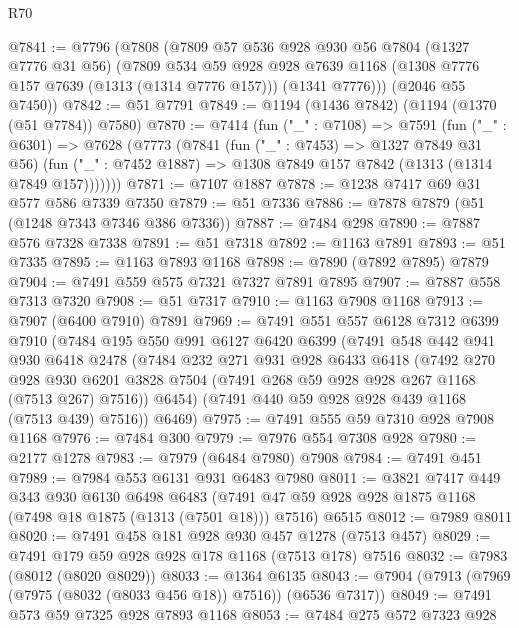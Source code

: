 \begin{lexlean}{R70}
\begin{coremodule}
@7841 := @7796
    (@7808
      (@7809
        @57
        @536
        @928
        @930
        @56
        @7804
        (@1327 @7776 @31 @56)
        (@7809
          @534
          @59
          @928
          @928
          @7639
          @1168
          (@1308 @7776 @157 @7639 (@1313 (@1314 @7776 @157)))
          (@1341 @7776)))
      (@2046 @55 @7450))
@7842 := @51 @7791
@7849 := @1194 (@1436 @7842) (@1194 (@1370 (@51 @7784)) @7580)
@7870 := @7414
    (fun ("_" : @7108) =>
    @7591
      (fun ("_" : @6301) =>
      @7628
        (@7773
          (@7841
            (fun ("_" : @7453) => @1327 @7849 @31 @56)
            (fun ("_" : @7452 @1887) => @1308 @7849 @157 @7842 (@1313 (@1314 @7849 @157)))))))
@7871 := @7107 @1887
@7878 := @1238 @7417 @69 @31 @577 @586 @7339 @7350
@7879 := @51 @7336
@7886 := @7878 @7879 (@51 (@1248 @7343 @7346 @386 @7336))
@7887 := @7484 @298
@7890 := @7887 @576 @7328 @7338
@7891 := @51 @7318
@7892 := @1163 @7891
@7893 := @51 @7335
@7895 := @1163 @7893 @1168
@7898 := @7890 (@7892 @7895) @7879
@7904 := @7491 @559 @575 @7321 @7327 @7891 @7895
@7907 := @7887 @558 @7313 @7320
@7908 := @51 @7317
@7910 := @1163 @7908 @1168
@7913 := @7907 (@6400 @7910) @7891
@7969 := @7491
    @551
    @557
    @6128
    @7312
    @6399
    @7910
    (@7484
      @195
      @550
      @991
      @6127
      @6420
      @6399
      (@7491
        @548
        @442
        @941
        @930
        @6418
        @2478
        (@7484
          @232
          @271
          @931
          @928
          @6433
          @6418
          (@7492
            @270
            @928
            @930
            @6201
            @3828
            @7504
            (@7491 @268 @59 @928 @928 @267 @1168 (@7513 @267) @7516))
          @6454)
        (@7491 @440 @59 @928 @928 @439 @1168 (@7513 @439) @7516))
      @6469)
@7975 := @7491 @555 @59 @7310 @928 @7908 @1168
@7976 := @7484 @300
@7979 := @7976 @554 @7308 @928
@7980 := @2177 @1278
@7983 := @7979 (@6484 @7980) @7908
@7984 := @7491 @451
@7989 := @7984 @553 @6131 @931 @6483 @7980
@8011 := @3821
    @7417
    @449
    @343
    @930
    @6130
    @6498
    @6483
    (@7491 @47 @59 @928 @928 @1875 @1168 (@7498 @18 @1875 (@1313 (@7501 @18))) @7516)
    @6515
@8012 := @7989 @8011
@8020 := @7491 @458 @181 @928 @930 @457 @1278 (@7513 @457)
@8029 := @7491 @179 @59 @928 @928 @178 @1168 (@7513 @178) @7516
@8032 := @7983 (@8012 (@8020 @8029))
@8033 := @1364 @6135
@8043 := @7904 (@7913 (@7969 (@7975 (@8032 (@8033 @456 @18)) @7516)) (@6536 @7317))
@8049 := @7491 @573 @59 @7325 @928 @7893 @1168
@8053 := @7484 @275 @572 @7323 @928

\end{coremodule}
\end{lexlean}
